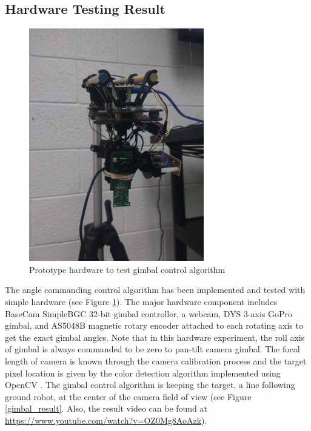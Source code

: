 \subsection{Hardware Testing Result}
\begin{figure}[htbp]
	\centering
	\includegraphics[width = 3in]{images/chapter2/gimbal_webcam.jpg}
	\caption{Prototype hardware to test gimbal control algorithm}
	\label{gimbal_webcam}
\end{figure}

The angle commanding control algorithm has been implemented and tested with simple hardware (see Figure \ref{gimbal_webcam}). The major hardware component includes BaseCam SimpleBGC 32-bit gimbal controller, a webcam, DYS 3-axis GoPro gimbal, and AS5048B magnetic rotary encoder attached to each rotating axis to get the exact gimbal angles. Note that in this hardware experiment, the roll axis of gimbal is always commanded to be zero to pan-tilt camera gimbal. The focal length of camera is known through the camera calibration process and the target pixel location is given by the color detection algorithm implemented using OpenCV \cite{itseez2015opencv}. The gimbal control algorithm is keeping the target, a line following ground robot, at the center of the camera field of view (see Figure \ref{gimbal_result}. Also, the result video can be found at \href{https://www.youtube.com/watch?v=OZ0Mg8AoAzk}{https://www.youtube.com/watch?v=OZ0Mg8AoAzk}). 

